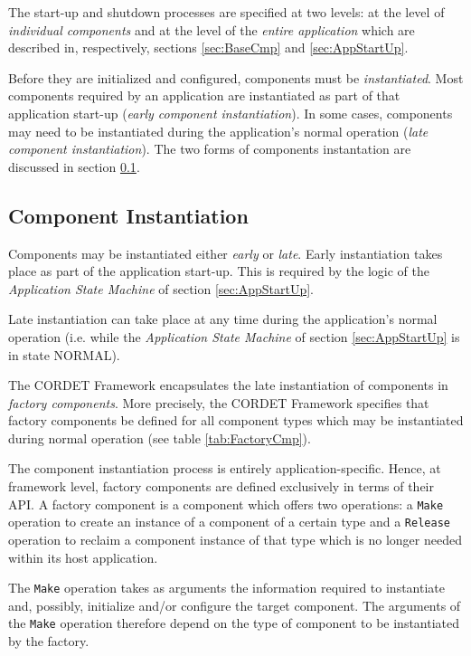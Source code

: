\documentclass[a4paper,10pt]{article}
\begin{document}
The start-up and shutdown processes are specified at two levels: at the level of \textit{individual components} and at the level of the \textit{entire application} which are described in, respectively, sections \ref{sec:BaseCmp} and \ref{sec:AppStartUp}.

Before they are initialized and configured, components must be \textit{instantiated}. Most components required by an application are instantiated as part of that application start-up (\textit{early component instantiation}). In some cases, components may need to be instantiated during the application's normal operation (\textit{late component instantiation}). The two forms of components instantation are discussed in section \ref{sec:CmpInst}.

\subsection{Component Instantiation}\label{sec:CmpInst}

Components may be instantiated either \textit{early} or \textit{late}. Early instantiation takes place as part of the application start-up. This is required by the logic of the \textit{Application State Machine} of section \ref{sec:AppStartUp}.

Late instantiation can take place at any time during the application's normal operation (i.e. while the \textit{Application State Machine} of section \ref{sec:AppStartUp} is in state NORMAL). 

The CORDET Framework encapsulates the late instantiation of components in \textit{factory components}. More precisely, the CORDET Framework specifies that factory components be defined for all component types which may be instantiated during normal operation (see table \ref{tab:FactoryCmp}).

The component instantiation process is entirely application-specific. 
Hence, at framework level, factory components are defined exclusively in terms of their API. A factory component is a component which offers two operations: a \texttt{Make} operation to create an instance of a component of a certain type and a \texttt{Release} operation to reclaim a component instance of that type which is no longer needed within its host application.

The \texttt{Make} operation takes as arguments the information required to instantiate and, possibly, initialize and/or configure the target component. The arguments of the \texttt{Make} operation therefore depend on the type of component to be instantiated by the factory.
\end{document}

